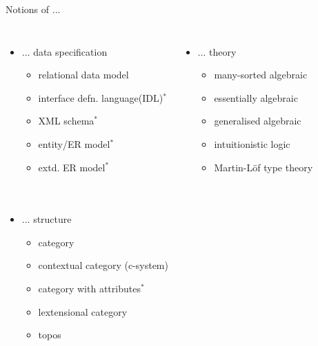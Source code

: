 \documentclass{beamer}
\begin{document}
\begin{frame}{Notions of ...}
\begin{columns}[t]
\column{6.0cm}
\pause \begin{itemize}
\item {... data specification
   \begin{itemize}
	    \item relational data model
			\item interface defn. language{\scriptsize(IDL)}$^*$
			\item {\scriptsize XML} schema$^*$
			\item entity/{\scriptsize ER} model$^*$
			\item extd. {\scriptsize ER} model$^*$
	 \end{itemize}
	 }
\end{itemize}
\column{5cm}
\pause \begin{itemize}
	\item {... theory
   \begin{itemize}
	    \item many-sorted algebraic
			\item essentially algebraic
			\item generalised algebraic
			\item intuitionistic logic
			\item Martin-L\"of type theory
	 \end{itemize}
	}
	\end{itemize}
\end{columns}
\begin{columns}[t]
\column{7.0cm}
\pause \begin{itemize}
\item {... structure
   \begin{itemize}
	    \item category
			\item contextual category (c-system)
			\item category with attributes$^*$
			\item lextensional category
			\item topos
	 \end{itemize}
	}
\end{itemize}
\column{4cm}
\end{columns}
 
 
 
\end{frame}
\end{document}
